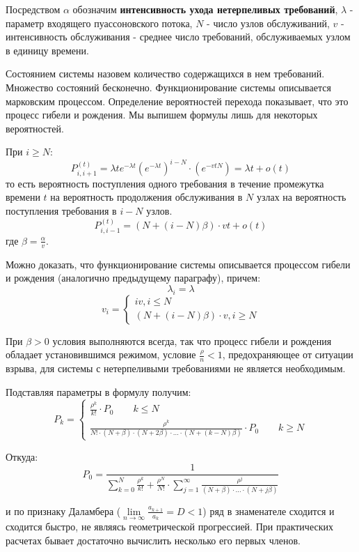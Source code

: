 \documentclass[aps,%
12pt,%
final,%
oneside,
onecolumn,%
musixtex, %
superscriptaddress,%
centertags]{article} %
\theoremstyle{plain}
\theoremstyle{definition}
\theoremstyle{remark}
\begin{document}
Посредством $\alpha$ обозначим \textbf{интенсивность ухода нетерпеливых требований}, $\lambda$ - параметр входящего пуассоновского потока, $N$ - число узлов обслуживаний, $v$ - интенсивность обслуживания - среднее число требований, обслуживаемых узлом в единицу времени.

Состоянием системы назовем количество содержащихся в нем требований. Множество состояний бесконечно. Функционирование системы описывается марковским процессом. Определение вероятностей перехода показывает, что это процесс гибели и рождения. Мы выпишем формулы лишь для некоторых вероятностей.

При $i \geq N$:
$$P_{i,i+1}^{(t)} = \lambda t e^{-\lambda t}(e^{-\lambda t})^{i-N} \cdot (e^{-vtN}) = \lambda t + o(t)$$
то есть вероятность поступления одного требования в течение промежутка времени $t$ на вероятность продолжения обслуживания в $N$ узлах на вероятность поступления требования в $i-N$ узлов.
$$P_{i,i-1}^{(t)} = (N+(i-N)\beta)\cdot vt + o(t)$$
где $\beta = \frac{\alpha}{v}$.

Можно доказать, что функционирование системы описывается процессом гибели и рождения (аналогично предыдущему параграфу), причем:
$$ \lambda_i  = \lambda $$
$$v_i = \begin{cases}
	iv, i \leq N \\
	 (N+(i-N)\beta)\cdot v, i \geq N
\end{cases}$$

При $\beta > 0$ условия выполняются всегда, так что процесс гибели и рождения обладает установившимся режимом, условие $\frac{\rho}{n} < 1$, предохраняющее от ситуации взрыва, для системы с нетерпеливыми требованиями не является необходимым.

Подставляя параметры в формулу получим:
$$P_k = \begin{cases}
	\frac{\rho^k}{k!} \cdot P_0 \qquad k \leq N\\
	\frac{\rho^k}{N! \cdot (N+\beta)\cdot (N+2\beta) \cdot \ldots \cdot (N+(k-N)\beta)} \cdot P_0 \qquad k \geq N
\end{cases}$$

Откуда:
$$P_0 = \frac{1}{\sum\limits_{k=0}^N \frac{\rho^k}{k!} + \frac{\rho^N}{N!}\cdot \sum\limits_{j=1}^{\infty}\frac{\rho^j}{(N+\beta)\cdot \ldots \cdot (N+j\beta)}}$$

и по признаку Даламбера ($\lim\limits_{n \to \infty} \frac{a_{k+1}}{a_k} = D < 1$) ряд в знаменателе сходится и сходится быстро, не являясь геометрической прогрессией. При практических расчетах бывает достаточно вычислить несколько его первых членов.
\end{document}
